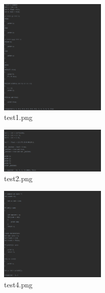 \documentclass{article}
\begin{document}
					
									\begin{multicols}{2}
			
			
				\begin{figure}[H]
					\centering
			 			\includegraphics[width=0.45\textwidth]{test1.png}
			 			\centering
			  			\caption{test1.png}
			  			\label{fig:test1}
					\end{figure}
					
			\begin{figure}[H]
					\centering
			 			\includegraphics[width=0.45\textwidth]{test2.png}
			 			\centering
			  			\caption{test2.png}
			  			\label{fig:test2}
					\end{figure}
					
										
					\begin{figure}[H]
					\centering
			 			\includegraphics[width=0.45\textwidth]{test4.png}
			 			\centering
			  			\caption{test4.png}
			  			\label{fig:test4}
					\end{figure}
					

\end{multicols}
\end{document}
